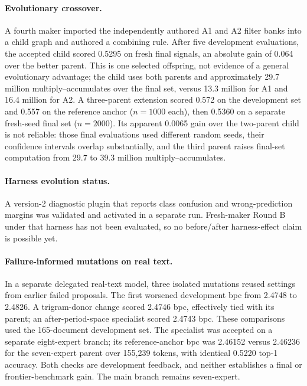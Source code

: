\documentclass[11pt]{article}
\begin{document}
\paragraph{Evolutionary crossover.} A fourth maker imported the independently
authored A1 and A2 filter banks into a child graph and authored a combining rule.
After five development evaluations, the accepted child scored 0.5295 on fresh final
signals, an absolute gain of 0.064 over the better parent. This is one selected
offspring, not evidence of a general evolutionary advantage; the child uses both
parents and approximately 29.7 million multiply--accumulates over the final set,
versus 13.3 million for A1 and 16.4 million for A2. A three-parent extension
scored 0.572 on the development set and 0.557 on the reference anchor
($n=1000$ each), then 0.5360 on a separate fresh-seed final set ($n=2000$).
Its apparent 0.0065 gain over the two-parent child is not reliable: those
final evaluations used different random seeds, their confidence intervals
overlap substantially, and the third parent raises final-set computation
from 29.7 to 39.3 million multiply--accumulates.

\paragraph{Harness evolution status.} A version-2 diagnostic plugin that reports
class confusion and wrong-prediction margins was validated and activated in a
separate run. Fresh-maker Round B under that harness has not been evaluated, so no
before/after harness-effect claim is possible yet.

\paragraph{Failure-informed mutations on real text.} In a separate delegated
real-text model, three isolated mutations reused settings from earlier failed
proposals. The first worsened development bpc from 2.4748 to 2.4826. A
trigram-donor change scored 2.4746 bpc, effectively tied with its parent; an
after-period-space specialist scored 2.4743 bpc. These comparisons used the
165-document development set. The specialist was accepted on a separate
eight-expert branch; its reference-anchor bpc was 2.46152 versus 2.46236
for the seven-expert parent over 155{,}239 tokens, with identical 0.5220
top-1 accuracy. Both checks are development feedback, and neither establishes
a final or frontier-benchmark gain. The main branch remains seven-expert.
\end{document}
